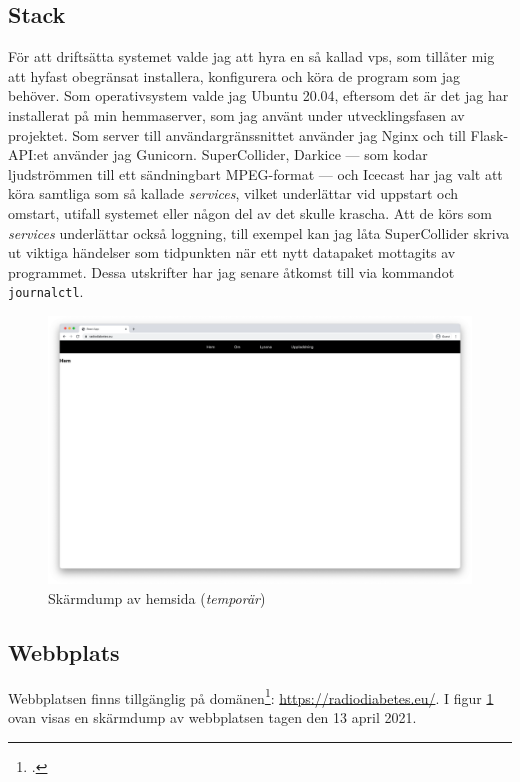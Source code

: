 \documentclass[11pt, a4paper]{article} %
\begin{document}
\subsection*{Stack}
För att driftsätta systemet valde jag att hyra en så kallad \gls{vps}, som tillåter mig att hyfast obegränsat installera, konfigurera och köra de program som jag behöver. Som operativsystem valde jag Ubuntu 20.04, eftersom det är det jag har installerat på min hemmaserver, som jag använt under utvecklingsfasen av projektet. Som server till användargränssnittet använder jag Nginx och till Flask-API:et använder jag Gunicorn. SuperCollider, Darkice --- som kodar ljudströmmen till ett sändningbart MPEG-format --- och Icecast har jag valt att köra samtliga som så kallade \emph{services}, vilket underlättar vid uppstart och omstart, utifall systemet eller någon del av det skulle krascha. Att de körs som \emph{services} underlättar också loggning, till exempel kan jag låta SuperCollider skriva ut viktiga händelser som tidpunkten när ett nytt datapaket mottagits av programmet. Dessa utskrifter har jag senare åtkomst till via kommandot \texttt{journalctl}.


\begin{figure}[H]
\centering
\includegraphics[width=\textwidth]{../media/hemsida.png}
\caption{Skärmdump av hemsida (\emph{temporär})}
\label{hemsida}
\end{figure}


\subsection*{Webbplats}
Webbplatsen finns tillgänglig på domänen\footcite{jondell_radio_nodate}: \url{https://radiodiabetes.eu/}. I figur \ref{hemsida} ovan visas en skärmdump av webbplatsen tagen den 13 april 2021.
\end{document}
